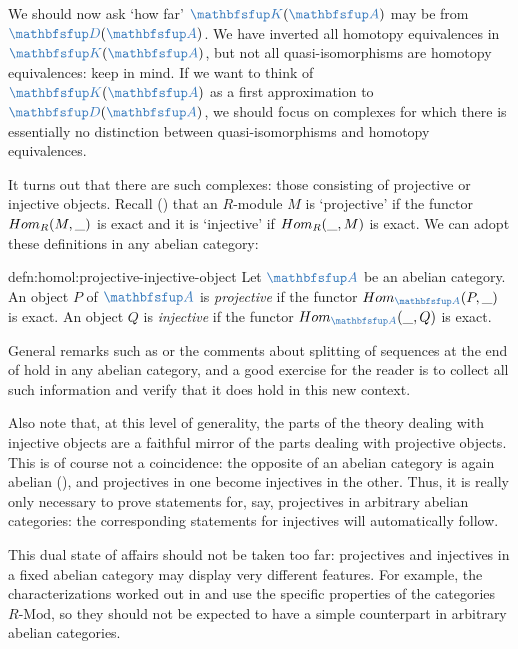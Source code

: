 We should now ask `how far' $\categ{K}(\categ{A})$ may be from
$\categ{D}(\categ{A})$. We have inverted all homotopy equivalences in
$\categ{K}(\categ{A})$, but not all quasi-isomorphisms are homotopy
equivalences: keep  in mind. If we want to think of
$\categ{K}(\categ{A})$ as a first approximation to
$\categ{D}(\categ{A})$, we should focus on complexes for which there
is essentially no distinction between quasi-isomorphisms and homotopy
equivalences.

It turns out that there are such complexes: those consisting of
projective or injective objects. Recall () that an
$R$-module $M$ is `projective' if the functor $Hom_R(M, \_)$ is exact
and it is `injective' if $Hom_R(\_, M)$ is exact. We can adopt these
definitions in any abelian category:

\begin{defn}{}{defn:homol:projective-injective-object}
  Let $\categ{A}$ be an abelian category. An object $P$ of $\categ{A}$
  is \emph{projective} if the functor $\Hom_{\categ{A}}(P, \_)$ is
  exact. An object $Q$ is \emph{injective} if the functor
  $\Hom_{\categ{A}}(\_, Q)$ is exact.
\end{defn}

General remarks such as  or the comments about
splitting of sequences at the end of
 hold in any abelian
category, and a good exercise for the reader is to collect all such
information and verify that it does hold in this new context.

Also note that, at this level of generality, the parts of the theory
dealing with injective objects are a faithful mirror of the parts
dealing with projective objects. This is of course not a coincidence:
the opposite of an abelian category is again abelian
(), and projectives in
one become injectives in the other. Thus, it is really only necessary
to prove statements for, say, projectives in arbitrary abelian
categories: the corresponding statements for injectives will
automatically follow.

This dual state of affairs should not be taken too far: projectives
and injectives in a fixed abelian category may display very different
features. For example, the characterizations worked out in
 and
 use the specific properties
of the categories $R\text{-Mod}$, so they should not be expected to
have a simple counterpart in arbitrary abelian categories.

